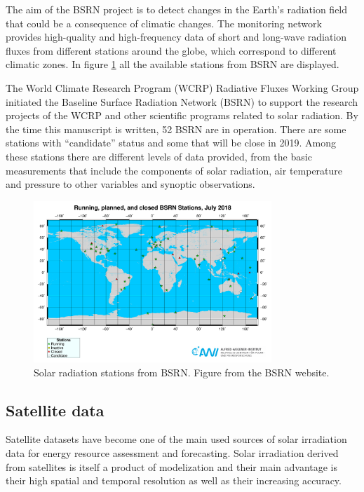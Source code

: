 The aim of the BSRN project is to detect changes in the Earth's radiation field that could be a consequence of climatic changes. The monitoring network provides high-quality and high-frequency data of short and long-wave radiation fluxes from different stations around the globe, which correspond to different climatic zones. In figure \ref{fig:bsrnstations} all the available stations from BSRN are displayed.

The World Climate Research Program (WCRP) Radiative Fluxes Working Group initiated the Baseline Surface Radiation Network (BSRN) to support the research projects of the WCRP and other scientific programs related to solar radiation. By the time this manuscript is written, 52 BSRN are in operation. There are some stations with ``candidate'' status and some that will be close in 2019. Among these stations there are different levels of data provided, from the basic measurements that include the components of solar radiation, air temperature and pressure to other variables and synoptic observations.

\begin{figure}[h]
  \centering
  \includegraphics[width=0.8\textwidth]{DataMethodsFIGS/bsrn.pdf}
  \caption{Solar radiation stations from BSRN. Figure from the BSRN website.}
 \label{fig:bsrnstations}
\end{figure}

\subsection{Satellite data}
 
Satellite datasets have become one of the main used sources of solar irradiation data for energy resource assessment and forecasting. Solar irradiation derived from satellites is itself a product of modelization and their main advantage is their high spatial and temporal resolution as well as their increasing accuracy. 

